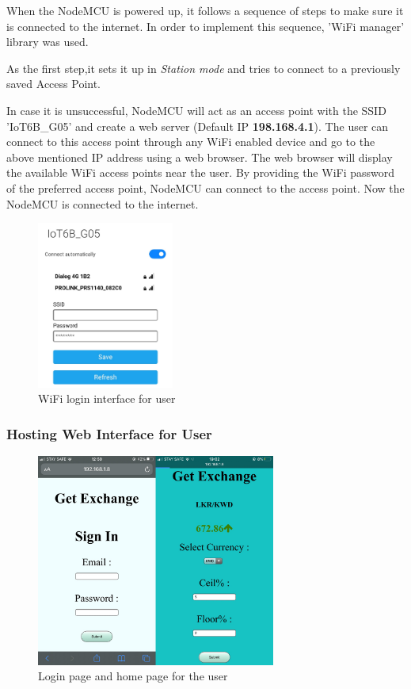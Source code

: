 When the NodeMCU is powered up, it follows a sequence of steps to make sure it is connected to the internet. In order to implement this sequence, 'WiFi manager' library was used.

As the first step,it sets it up in \textit{Station mode} and tries to connect to a previously saved Access Point.

In case it is unsuccessful, NodeMCU will act as an access point with the SSID 'IoT6B\_G05' and create a web server (Default IP \textbf{198.168.4.1}). The user can connect to this access point through any WiFi enabled device and go to the above mentioned IP address using a web browser. The web browser will display the available WiFi access points near the user. By providing the WiFi password of the preferred access point, NodeMCU can connect to the access point. Now the NodeMCU is connected to the internet.

\begin{figure}[H]
    \centering
      \includegraphics[width=0.4\textwidth]{images/wifilogin.jpeg}
    \caption{WiFi login interface for user}
    \label{fig:wifilogin}
\end{figure}

\subsubsection{Hosting Web Interface for User}

\begin{figure}[H]
    \centering
      \includegraphics[width=0.7\textwidth]{images/login.png}
    \caption{Login page and home page for the user}
    \label{fig:host}
\end{figure}

